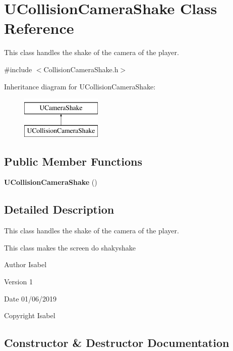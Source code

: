 \section{U\+Collision\+Camera\+Shake Class Reference}
\label{class_u_collision_camera_shake}


This class handles the shake of the camera of the player.  




{\ttfamily \#include $<$Collision\+Camera\+Shake.\+h$>$}

Inheritance diagram for U\+Collision\+Camera\+Shake\+:\begin{figure}[H]
\begin{center}
\leavevmode
\includegraphics[height=2.000000cm]{class_u_collision_camera_shake}
\end{center}
\end{figure}
\subsection*{Public Member Functions}
\begin{DoxyCompactItemize}
\item 
\textbf{ U\+Collision\+Camera\+Shake} ()
\end{DoxyCompactItemize}


\subsection{Detailed Description}
This class handles the shake of the camera of the player. 

This class makes the screen do shakyshake \begin{DoxyAuthor}{Author}
Isabel 
\end{DoxyAuthor}
\begin{DoxyVersion}{Version}
1 
\end{DoxyVersion}
\begin{DoxyDate}{Date}
01/06/2019 
\end{DoxyDate}
\begin{DoxyCopyright}{Copyright}
Isabel 
\end{DoxyCopyright}


\subsection{Constructor \& Destructor Documentation}
\mbox{\label{class_u_collision_camera_shake_a50c0f91829830d83ca2d185821325383}} 
